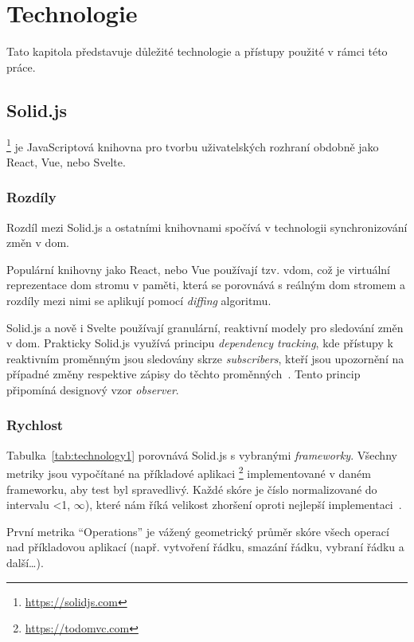 \chapter{Technologie}

Tato kapitola představuje důležité technologie a přístupy použité v rámci této práce.

\section{Solid.js}

\footnote{\url{https://solidjs.com}} je JavaScriptová knihovna pro tvorbu uživatelských rozhraní obdobně jako React, Vue, nebo Svelte.


\subsection{Rozdíly}

Rozdíl mezi Solid.js a ostatními knihovnami spočívá v technologii synchronizování změn v \gls{dom}.

Populární knihovny jako React, nebo Vue používají tzv. \gls{vdom}, což je virtuální reprezentace \gls{dom} stromu v paměti, která se porovnává s reálným \gls{dom} stromem a rozdíly mezi nimi se aplikují pomocí \textit{diffing} algoritmu.

Solid.js a nově i Svelte používají granulární, reaktivní modely pro sledování změn v \gls{dom}.
Prakticky Solid.js využívá principu \textit{dependency tracking}, kde přístupy k reaktivním proměnným jsou sledovány skrze \textit{subscribers}, kteří jsou upozornění na případné změny respektive zápisy do těchto proměnných~\cite{solid-reactivity}.
Tento princip připomíná designový vzor \textit{observer}.

\subsection{Rychlost}

Tabulka~\ref{tab:technology1} porovnává Solid.js s vybranými \textit{frameworky}.
Všechny metriky jsou vypočítané na příkladové aplikaci \footnote{\url{https://todomvc.com}} implementované v daném frameworku, aby test byl spravedlivý.
Každé skóre je číslo normalizované do intervalu <1, $\infty$), které nám říká velikost zhoršení oproti nejlepší implementaci~\cite{krausest120,krausest122}.

První metrika ``Operations'' je vážený geometrický průměr skóre všech operací nad příkladovou aplikací (např. vytvoření řádku, smazání řádku, vybraní řádku a další\dots).

